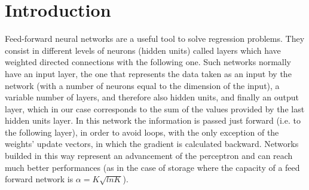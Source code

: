 \section{Introduction}
\label{sec:introduction}

Feed-forward neural networks are a useful tool to solve regression problems.
They consist in different levels of neurons (hidden units) called layers which have weighted directed connections with the following one.
Such networks normally have an input layer, the one that represents the data taken as an input by the network (with a number of neurons equal
to the dimension of the input), a variable number of layers, and therefore also hidden units, and finally an output layer, which in our case
corresponds to the sum of the values provided by the last hidden units layer. In this network the information is passed
just forward (i.e. to the following layer), in order to avoid loops, with the only exception of the  weights' update vectors, in which the gradient is calculated backward.
Networks builded in this way represent an advancement of the perceptron and can reach much better performances (as in the case of storage where the capacity of a feed forward network is $\alpha = K \sqrt{ln K}$).

\cite{chauvin1995backpropagation}

